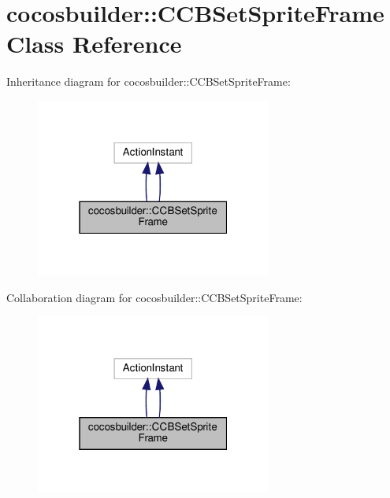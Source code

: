 \hypertarget{classcocosbuilder_1_1CCBSetSpriteFrame}{}\section{cocosbuilder\+:\+:C\+C\+B\+Set\+Sprite\+Frame Class Reference}
\label{classcocosbuilder_1_1CCBSetSpriteFrame}


Inheritance diagram for cocosbuilder\+:\+:C\+C\+B\+Set\+Sprite\+Frame\+:
\nopagebreak
\begin{figure}[H]
\begin{center}
\leavevmode
\includegraphics[width=220pt]{classcocosbuilder_1_1CCBSetSpriteFrame__inherit__graph}
\end{center}
\end{figure}


Collaboration diagram for cocosbuilder\+:\+:C\+C\+B\+Set\+Sprite\+Frame\+:
\nopagebreak
\begin{figure}[H]
\begin{center}
\leavevmode
\includegraphics[width=220pt]{classcocosbuilder_1_1CCBSetSpriteFrame__coll__graph}
\end{center}
\end{figure}
